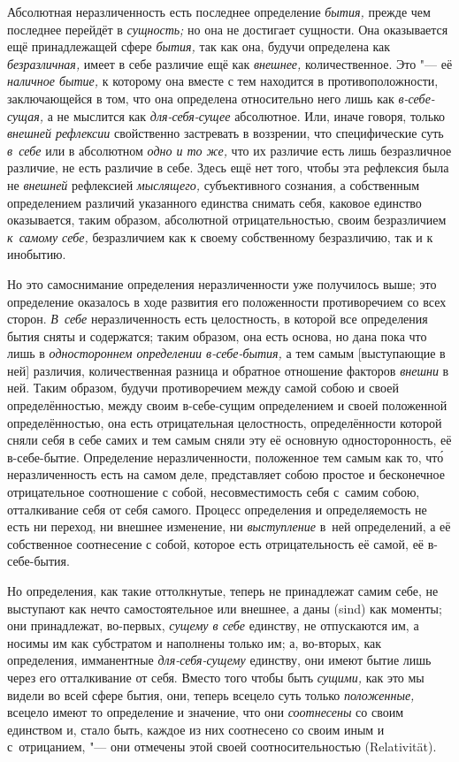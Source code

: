 
Абсолютная неразличенность есть последнее определение {\em бытия,} прежде чем
последнее перейдёт в {\em сущность;} но она не достигает сущности. Она
оказывается ещё принадлежащей сфере {\em бытия,} так как она, будучи определена
как {\em безразличная,} имеет в себе различие ещё как {\em внешнее,}
количественное. Это "--- её {\em наличное бытие,} к которому она вместе с тем
находится в противоположности, заключающейся в том, что она определена
относительно него лишь как {\em в-себе-сущая,} а не мыслится как
{\em для-себя-сущее} абсолютное. Или, иначе говоря, только
{\em внешней рефлексии} свойственно застревать в воззрении, что специфические
суть {\em в~себе} или в абсолютном {\em одно и то же,} что их различие есть
лишь безразличное различие, не есть различие в себе. Здесь ещё нет того, чтобы
эта рефлексия была не {\em внешней} рефлексией {\em мыслящего,} субъективного
сознания, а собственным определением различий указанного единства снимать себя,
каковое единство оказывается, таким образом, абсолютной отрицательностью, своим
безразличием {\em к~самому себе,} безразличием как к своему собственному
безразличию, так и к инобытию.

Но это самоснимание определения неразличенности уже получилось выше; это
определение оказалось в ходе развития его положенности противоречием со всех
сторон. {\em В~себе} неразличенность есть целостность, в которой все
определения бытия сняты и содержатся; таким образом, она есть основа, но дана
пока что лишь в {\em одностороннем определении в-себе-бытия,} а тем самым
[выступающие в ней] различия, количественная разница и обратное отношение
факторов {\em внешни} в ней. Таким образом, будучи противоречием между самой
собою и своей определённостью, между своим в-себе-сущим определением и своей
положенной определённостью, она есть отрицательная целостность, определённости
которой сняли себя в себе самих и тем самым сняли эту её основную
односторонность, её в-себе-бытие. Определение неразличенности, положенное тем
самым как то, чт\'{о} неразличенность есть на самом деле, представляет собою
простое и бесконечное отрицательное соотношение с собой, несовместимость себя
с~самим собою, отталкивание себя от себя самого. Процесс определения и
определяемость не есть ни переход, ни внешнее изменение, ни {\em выступление}
в~ней определений, а её собственное соотнесение с собой, которое есть
отрицательность её самой, её в-себе-бытия.

Но определения, как такие оттолкнутые, теперь не принадлежат самим себе, не
выступают как нечто самостоятельное или внешнее, а даны (sind) как моменты; они
принадлежат, во-первых, {\em сущему в себе} единству, не отпускаются им, а
носимы им как субстратом и наполнены только им; а, во-вторых, как определения,
имманентные {\em для-себя-сущему} единству, они имеют бытие лишь через его
отталкивание от себя. Вместо того чтобы быть {\em сущими,} как это мы видели во
всей сфере бытия, они, теперь всецело суть только {\em положенные,} всецело
имеют то определение и значение, что они {\em соотнесены} со своим единством и,
стало быть, каждое из них соотнесено со своим иным и с~отрицанием, "--- они
отмечены этой своей соотносительностью (Rela\-tivi\-tät).

